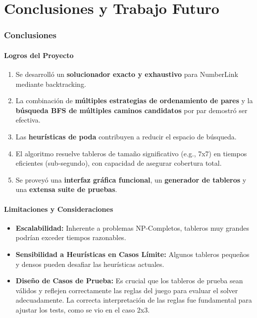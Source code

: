 \documentclass[spanish]{article}
\numberwithin{equation}{section}
\numberwithin{figure}{section}
\theoremstyle{definition}
\begin{document}
\part{Conclusiones y Trabajo Futuro}
\section{Conclusiones}

\subsection{Logros del Proyecto}
\begin{enumerate}
    \item Se desarrolló un \textbf{solucionador exacto y exhaustivo} para NumberLink mediante backtracking.
    \item La combinación de \textbf{múltiples estrategias de ordenamiento de pares} y la \textbf{búsqueda BFS de múltiples caminos candidatos} por par demostró ser efectiva.
    \item Las \textbf{heurísticas de poda} contribuyen a reducir el espacio de búsqueda.
    \item El algoritmo resuelve tableros de tamaño significativo (e.g., 7x7) en tiempos eficientes (sub-segundo), con capacidad de asegurar cobertura total.
    \item Se proveyó una \textbf{interfaz gráfica funcional}, un \textbf{generador de tableros} y una \textbf{extensa suite de pruebas}.
\end{enumerate}

\subsection{Limitaciones y Consideraciones}
\begin{itemize}
    \item \textbf{Escalabilidad:} Inherente a problemas NP-Completos, tableros muy grandes podrían exceder tiempos razonables.
    \item \textbf{Sensibilidad a Heurísticas en Casos Límite:} Algunos tableros pequeños y densos pueden desafiar las heurísticas actuales.
    \item \textbf{Diseño de Casos de Prueba:} Es crucial que los tableros de prueba sean válidos y reflejen correctamente las reglas del juego para evaluar el solver adecuadamente. La correcta interpretación de las reglas fue fundamental para ajustar los tests, como se vio en el caso 2x3.
\end{itemize}
\end{document}
